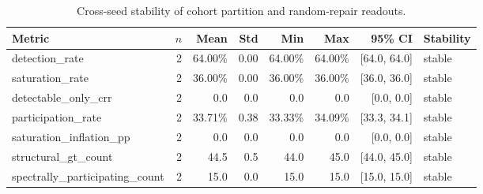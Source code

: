 \begin{table}[t]
\centering
\small
\caption{Cross-seed stability of cohort partition and random-repair readouts.}
\label{tab:multiseed-stability}
\begin{tabular}{@{}lrrrrrrl@{}}
\toprule
Metric & $n$ & Mean & Std & Min & Max & 95\% CI & Stability \\
\midrule
detection\_rate & 2 & 64.00\% & 0.00 & 64.00\% & 64.00\% & [64.0, 64.0] & stable \\
saturation\_rate & 2 & 36.00\% & 0.00 & 36.00\% & 36.00\% & [36.0, 36.0] & stable \\
detectable\_only\_crr & 2 & 0.0 & 0.0 & 0.0 & 0.0 & [0.0, 0.0] & stable \\
participation\_rate & 2 & 33.71\% & 0.38 & 33.33\% & 34.09\% & [33.3, 34.1] & stable \\
saturation\_inflation\_pp & 2 & 0.0 & 0.0 & 0.0 & 0.0 & [0.0, 0.0] & stable \\
structural\_gt\_count & 2 & 44.5 & 0.5 & 44.0 & 45.0 & [44.0, 45.0] & stable \\
spectrally\_participating\_count & 2 & 15.0 & 0.0 & 15.0 & 15.0 & [15.0, 15.0] & stable \\
\bottomrule
\end{tabular}
\end{table}

